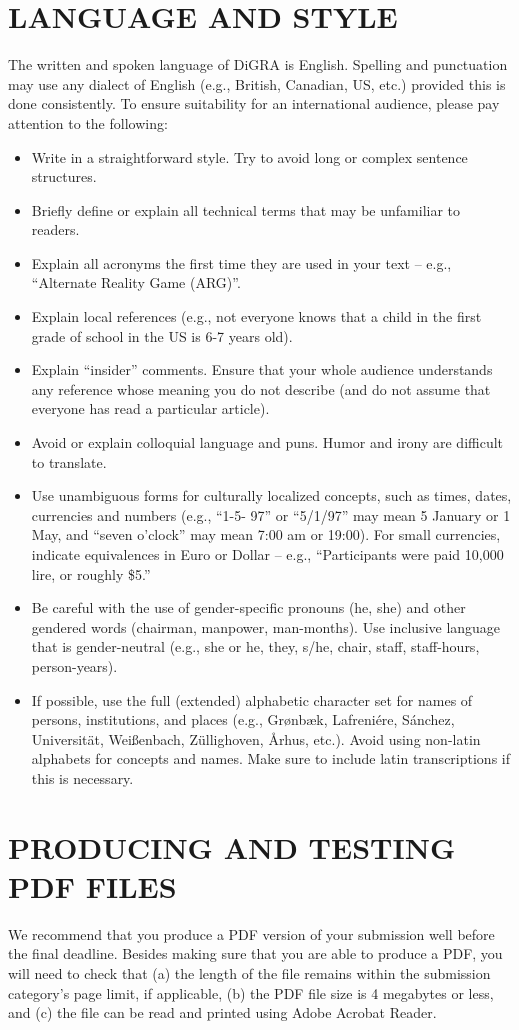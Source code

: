 \documentclass[11pt]{article}
\begin{document}
\section*{LANGUAGE AND STYLE}
The written and spoken language of DiGRA is English. Spelling and punctuation may use
any dialect of English (e.g., British, Canadian, US, etc.) provided this is done
consistently. To ensure suitability for an international audience, please pay attention to
the following:
\begin{itemize}
\item Write in a straightforward style. Try to avoid long or complex sentence
structures.
\item Briefly define or explain all technical terms that may be unfamiliar to readers.
\item Explain all acronyms the first time they are used in your text – e.g., ``Alternate
Reality Game (ARG)''.
\item Explain local references (e.g., not everyone knows that a child in the first grade
of school in the US is 6-7 years old).

\item Explain ``insider'' comments. Ensure that your whole audience understands any
reference whose meaning you do not describe (and do not assume that everyone
has read a particular article).
\item Avoid or explain colloquial language and puns. Humor and irony are difficult to
translate.
\item Use unambiguous forms for culturally localized concepts, such as times, dates,
currencies and numbers (e.g., ``1-5- 97'' or ``5/1/97'' may mean 5 January or 1
May, and ``seven o'clock'' may mean 7:00 am or 19:00). For small currencies,
indicate equivalences in Euro or Dollar – e.g., ``Participants were paid 10,000 lire,
or roughly \$5.''
\item Be careful with the use of gender-specific pronouns (he, she) and other gendered
words (chairman, manpower, man-months). Use inclusive language that is
gender-neutral (e.g., she or he, they, s/he, chair, staff, staff-hours, person-years).
\item If possible, use the full (extended) alphabetic character set for names of persons,
institutions, and places (e.g., Grønbæk, Lafreniére, Sánchez, Universität,
Weißenbach, Züllighoven, Århus, etc.). Avoid using non-latin alphabets for
concepts and names. Make sure to include latin transcriptions if this is necessary.
\end{itemize}
\section*{PRODUCING AND TESTING PDF FILES}
We recommend that you produce a PDF version of your submission well before the final
deadline. Besides making sure that you are able to produce a PDF, you will need to
check that (a) the length of the file remains within the submission category's page limit, if
applicable, (b) the PDF file size is 4 megabytes or less, and (c) the file can be read and
printed using Adobe Acrobat Reader.
\end{document}
